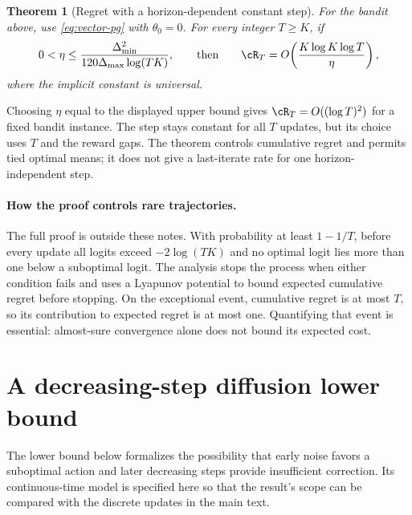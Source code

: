 \documentclass[11pt,twoside]{article}
\newtheorem{theorem}{Theorem}[section]
\theoremstyle{definition}
\theoremstyle{remark}
\begin{document}
\begin{theorem}[Regret with a horizon-dependent constant step]
\label{thm:small-step}
For the bandit above, use \cref{eq:vector-pg} with $\theta_0=0$.
For every integer $T\ge K$, if
\[
 0<\eta\le\frac{\Delta_{\min}^2}
 {120\Delta_{\max}\log(TK)},
 \qquad\text{then}\qquad
 \cR_T=O\!\left(\frac{K\log K\log T}{\eta}\right),
\]
where the implicit constant is universal.
\end{theorem}

Choosing $\eta$ equal to the displayed upper bound gives
$\cR_T=O((\log T)^2)$ for a fixed bandit instance.
The step stays constant for all $T$ updates, but its choice uses $T$ and
the reward gaps. The theorem controls cumulative regret and permits tied
optimal means; it does not give a last-iterate rate for one
horizon-independent step.

\paragraph{How the proof controls rare trajectories.}
The full proof is outside these notes. With probability at least $1-1/T$,
before every update all logits exceed $-2\log(TK)$ and no optimal logit
lies more than one below a suboptimal logit.
The analysis stops the process when either condition fails and uses a
Lyapunov potential to bound expected cumulative regret before stopping.
On the exceptional event, cumulative regret is at most $T$, so its
contribution to expected regret is at most one. Quantifying that event
is essential: almost-sure convergence alone does not bound its expected cost.

\section{A decreasing-step diffusion lower bound}
\label{app:diffusion}

The lower bound below formalizes the possibility that early noise favors a
suboptimal action and later decreasing steps provide insufficient correction.
Its continuous-time model is specified here so that the result's scope can
be compared with the discrete updates in the main text.
\end{document}
